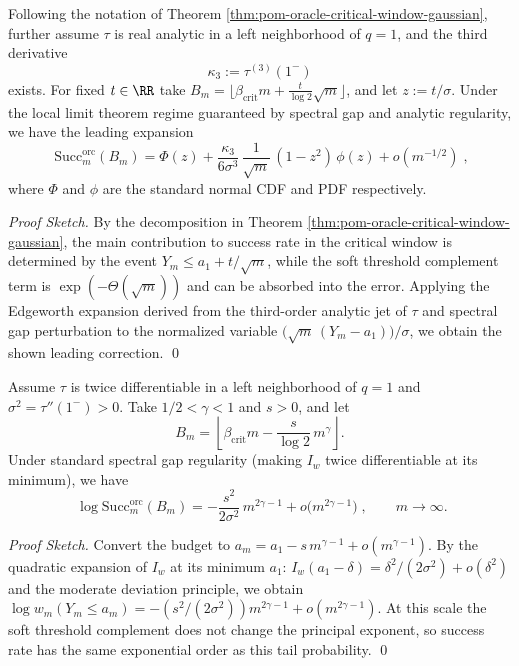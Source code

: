 \begin{theorem}\label{thm:pom-oracle-critical-window-edgeworth}
Following the notation of Theorem \ref{thm:pom-oracle-critical-window-gaussian}, further assume \(\tau\) is real analytic in a left neighborhood of \(q=1\), and the third derivative
\[
\kappa_3:=\tau^{(3)}(1^-)
\]
exists.
For fixed \(t\in\RR\) take
\(
B_m=\bigl\lfloor \beta_{\mathrm{crit}}m+\frac{t}{\log 2}\sqrt m\bigr\rfloor
\), and let \(z:=t/\sigma\).
Under the local limit theorem regime guaranteed by spectral gap and analytic regularity, we have the leading expansion
\[
\boxed{\;
\mathrm{Succ}^{\mathrm{orc}}_m(B_m)
=\Phi(z)+\frac{\kappa_3}{6\sigma^3}\,\frac{1}{\sqrt m}\,(1-z^2)\,\phi(z)+o(m^{-1/2})\; } ,
\]
where \(\Phi\) and \(\phi\) are the standard normal CDF and PDF respectively.
\end{theorem}
\begin{proof}[Proof Sketch]
By the decomposition in Theorem \ref{thm:pom-oracle-critical-window-gaussian}, the main contribution to success rate in the critical window is determined by the event \(Y_m\le a_1+t/\sqrt m\), while the soft threshold complement term is \(\exp(-\Theta(\sqrt m))\) and can be absorbed into the error.
Applying the Edgeworth expansion derived from the third-order analytic jet of \(\tau\) and spectral gap perturbation to the normalized variable \(\bigl(\sqrt m\,(Y_m-a_1)\bigr)/\sigma\), we obtain the shown leading correction. \qed
\end{proof}

\begin{proposition}\label{prop:pom-oracle-critical-window-mdp}
Assume \(\tau\) is twice differentiable in a left neighborhood of \(q=1\) and \(\sigma^2=\tau''(1^-)>0\).
Take \(1/2<\gamma<1\) and \(s>0\), and let
\[
B_m=\left\lfloor \beta_{\mathrm{crit}}m-\frac{s}{\log 2}\,m^\gamma\right\rfloor.
\]
Under standard spectral gap regularity (making \(I_w\) twice differentiable at its minimum), we have
\[
\boxed{\;
\log \mathrm{Succ}^{\mathrm{orc}}_m(B_m)
=-\frac{s^2}{2\sigma^2}\,m^{2\gamma-1}+o\!\bigl(m^{2\gamma-1}\bigr)\; } ,
\qquad m\to\infty.
\]
\end{proposition}
\begin{proof}[Proof Sketch]
Convert the budget to \(a_m=a_1-s\,m^{\gamma-1}+o(m^{\gamma-1})\).
By the quadratic expansion of \(I_w\) at its minimum \(a_1\): \(I_w(a_1-\delta)=\delta^2/(2\sigma^2)+o(\delta^2)\) and the moderate deviation principle, we obtain
\(
\log w_m(Y_m\le a_m)=-(s^2/(2\sigma^2))m^{2\gamma-1}+o(m^{2\gamma-1})
\).
At this scale the soft threshold complement does not change the principal exponent, so success rate has the same exponential order as this tail probability. \qed
\end{proof}

